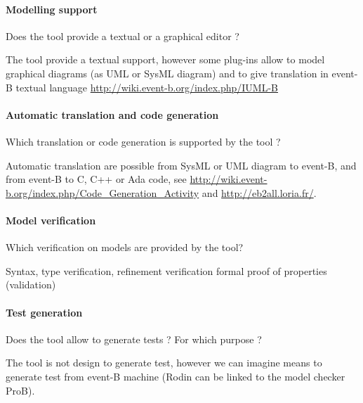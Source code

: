 \paragraph{Modelling support}
Does the tool provide a  textual or a graphical editor ?


\begin{author_comment}
The tool provide a textual support, however some plug-ins allow to  model graphical diagrams (as UML or SysML diagram) and to give translation in event-B textual language \url{http://wiki.event-b.org/index.php/IUML-B}
\end{author_comment}



\paragraph{Automatic translation and code generation}
Which translation or code generation is supported by the tool ?

\begin{author_comment}
Automatic translation are possible from SysML  or UML diagram to event-B, and from event-B to C, C++  or Ada code, see \url{http://wiki.event-b.org/index.php/Code_Generation_Activity} and \url{http://eb2all.loria.fr/}.
\end{author_comment}

\paragraph{Model verification}
Which verification on models are provided by the tool?

\begin{author_comment}

Syntax, type verification,
refinement verification
formal proof of properties (validation)
\end{author_comment}

\paragraph{Test generation}
Does the tool allow to generate tests ? For  which purpose ?

\begin{author_comment}

The tool is not design to generate test, however we can imagine means to  generate test from event-B machine (Rodin can be linked to the model checker ProB).
\end{author_comment}

